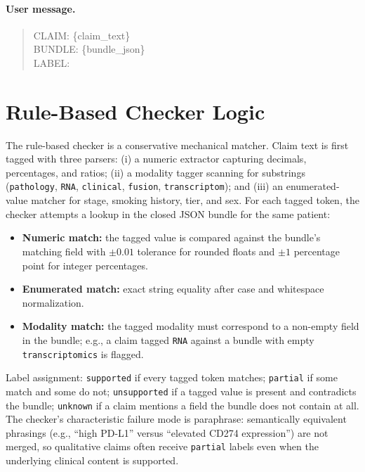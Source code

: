 \documentclass[11pt]{article}
\begin{document}
\paragraph{User message.}
\begin{quote}\small\ttfamily
CLAIM: \{claim\_text\}\\
BUNDLE: \{bundle\_json\}\\
LABEL:
\end{quote}

\section{Rule-Based Checker Logic}
\label{app:rulechecker}

The rule-based checker is a conservative mechanical matcher. Claim text is first tagged with three parsers: (i) a numeric extractor capturing decimals, percentages, and ratios; (ii) a modality tagger scanning for substrings (\texttt{pathology}, \texttt{RNA}, \texttt{clinical}, \texttt{fusion}, \texttt{transcriptom}); and (iii) an enumerated-value matcher for stage, smoking history, tier, and sex. For each tagged token, the checker attempts a lookup in the closed JSON bundle for the same patient:

\begin{itemize}
\item \textbf{Numeric match:} the tagged value is compared against the bundle's matching field with $\pm 0.01$ tolerance for rounded floats and $\pm 1$ percentage point for integer percentages.
\item \textbf{Enumerated match:} exact string equality after case and whitespace normalization.
\item \textbf{Modality match:} the tagged modality must correspond to a non-empty field in the bundle; e.g., a claim tagged \texttt{RNA} against a bundle with empty \texttt{transcriptomics} is flagged.
\end{itemize}

Label assignment: \texttt{supported} if every tagged token matches; \texttt{partial} if some match and some do not; \texttt{unsupported} if a tagged value is present and contradicts the bundle; \texttt{unknown} if a claim mentions a field the bundle does not contain at all. The checker's characteristic failure mode is paraphrase: semantically equivalent phrasings (e.g., ``high PD-L1'' versus ``elevated CD274 expression'') are not merged, so qualitative claims often receive \texttt{partial} labels even when the underlying clinical content is supported.
\end{document}
